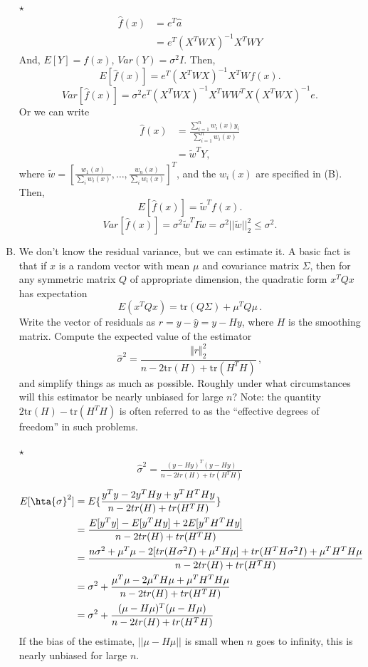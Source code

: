 \documentclass[11pt]{article}
\newcommand{\jie}{$\star$ }
\begin{document}
\begin{enumerate}[(A)]
\bigskip \jie
\begin{align*}
    \hat{f}(x) &= e^T \hat{a} \\
    &= e^T (X^T W X)^{-1} X^T W Y
\end{align*}
And, $E[Y] = f(x)$, $Var(Y) = \sigma^2 I$.
Then,
$$E[\hat{f}(x)] = e^T (X^T W X)^{-1} X^TWf(x).$$
$$Var[\hat{f}(x)] = \sigma^2 e^T (X^T W X)^{-1} X^T W W^T X (X^T W X)^{-1} e.$$
Or we can write
\begin{align*}
    \hat{f}(x) &= \frac{\sum_{i=1}^n w_i(x) y_i }{\sum_{i=1}^n w_i(x)} \\
    &= \tilde{w}^T Y,
\end{align*}
where $\tilde{w} = [\frac{w_1(x)}{\sum_i w_i(x)}, \dots, \frac{w_n(x)}{\sum_i w_i(x)}]^T$, and the $w_i(x)$ are specified in (B). Then,
$$E[\hat{f}(x)] = \tilde{w}^T f(x).$$
$$Var[\hat{f}(x)] = \sigma^2 \tilde{w}^T I \tilde{w} = \sigma^2 ||\tilde{w}||_2^2 \leq \sigma^2.$$
\bigskip

\item We don't know the residual variance, but we can estimate it.  A basic fact is that if $x$ is a random vector with mean $\mu$ and covariance matrix $\Sigma$, then for any symmetric matrix $Q$ of appropriate dimension, the quadratic form $x^T Q x$ has expectation
$$
E(x^T Q x) = \mbox{tr}(Q \Sigma) + \mu^T Q \mu \, .
$$
Write the vector of residuals as $r = y - \hat{y} = y - Hy$, where $H$ is the smoothing matrix.  Compute the expected value of the estimator
$$
\hat{\sigma}^2 = \frac{\Vert r \Vert_2^2}{n - 2\mbox{tr}(H) + \mbox{tr}(H^T H)} \, ,
$$
and simplify things as much as possible.  Roughly under what circumstances will this estimator be nearly unbiased for large $n$?  Note: the quantity $2\mbox{tr}(H) - \mbox{tr}(H^T H)$ is often referred to as the ``effective degrees of freedom'' in such problems.

\bigskip \jie
\begin{align*}
    \hat{\sigma}^2 = \frac{(y - Hy)^T (y - Hy)}{n - 2 tr(H) + tr(H^TH)}
\end{align*}
\begin{align*}
    E[\hta{\sigma}^2] &= E\{ \frac{y^Ty - 2y^T Hy + y^T H^T Hy}{n- 2tr(H) + tr(H^TH)} \} \\
    &= \frac{E[y^Ty] - E[y^THy] + 2E[y^TH^THy]}{n- 2tr(H) + tr(H^TH)} \\
    &= \frac{n\sigma^2 + \mu^T \mu - 2[tr(H\sigma^2 I) + \mu^T H \mu] + tr(H^TH\sigma^2I) + \mu^T H^T H \mu}{n- 2tr(H) + tr(H^TH)} \\
    &= \sigma^2 + \frac{\mu^T \mu - 2 \mu^T H\mu + \mu^T H^T H \mu}{n- 2tr(H) + tr(H^TH)} \\
    &= \sigma^2 + \frac{(\mu- H\mu)^T(\mu- H\mu)}{n- 2tr(H) + tr(H^TH)}
\end{align*}
If the bias of the estimate, $||\mu - H\mu||$ is small when $n$ goes to infinity, this is nearly unbiased for large $n$.
\bigskip



\end{enumerate}
\end{document}
